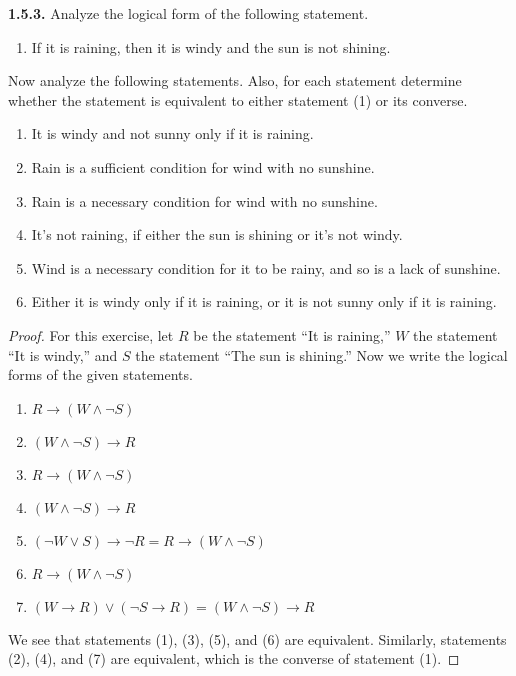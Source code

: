 \documentclass[12pt]{amsart}
\newenvironment{statement}[1]{\smallskip\noindent\color[rgb]{.6627, .3529, .6314} {\bf #1.}}{}
\theoremstyle{definition}
\theoremstyle{remark}
\begin{document}
\begin{statement}{1.5.3}
Analyze the logical form of the following statement.
\begin{enumerate}
	\item If it is raining, then it is windy and the sun is not shining.
\end{enumerate}
Now analyze the following statements.
Also, for each statement determine whether the statement is equivalent to either statement (1) or its converse.
\begin{enumerate}
	\item[(2)] It is windy and not sunny only if it is raining.
	\item[(3)] Rain is a sufficient condition for wind with no sunshine.
	\item[(4)] Rain is a necessary condition for wind with no sunshine.
	\item[(5)] It's not raining, if either the sun is shining or it's not windy.
	\item[(6)] Wind is a necessary condition for it to be rainy, and so is a lack of sunshine.
	\item[(7)] Either it is windy only if it is raining, or it is not sunny only if it is raining.
\end{enumerate}
\end{statement}

\begin{proof}
For this exercise, let $R$ be the statement ``It is raining,'' $W$ the statement ``It is windy,'' and $S$ the statement ``The sun is shining.''
Now we write the logical forms of the given statements.
\begin{enumerate}
	\item $R \rightarrow (W \wedge \neg S)$
	\item $(W \wedge \neg S) \rightarrow R$
	\item $R \rightarrow (W \wedge \neg S)$
	\item $(W \wedge \neg S) \rightarrow R$
	\item $(\neg W \vee S) \rightarrow \neg R = R \rightarrow (W \wedge \neg S)$
	\item $R \rightarrow (W \wedge \neg S)$
	\item $(W \rightarrow R) \vee (\neg S \rightarrow R) = (W \wedge \neg S) \rightarrow R$
\end{enumerate}
We see that statements (1), (3), (5), and (6) are equivalent.
Similarly, statements (2), (4), and (7) are equivalent, which is the converse of statement (1).
\end{proof}
\end{document}
